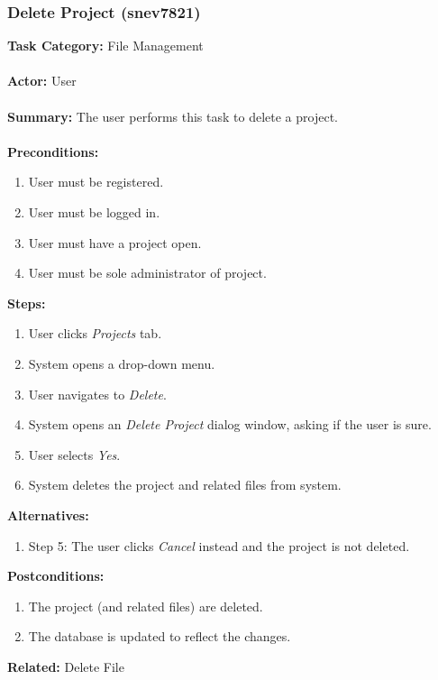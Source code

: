 \documentclass[11pt]{report}
\begin{document}
\subsubsection{Delete Project (snev7821)}
\begin{framed}

	\textbf{Task Category:} File Management \\ \\
	\textbf{Actor:} User \\ \\
	\textbf{Summary:} The user performs this task to delete a project. \\ \\
	\textbf{Preconditions:} 
	\begin{enumerate}
		\item User must be registered.
		\item User must be logged in.
		\item User must have a project open.
		\item User must be sole administrator of project.
	\end{enumerate}
	\textbf{Steps:}
	\begin{enumerate}
		\item User clicks \textit{Projects} tab.
		\item System opens a drop-down menu.
		\item User navigates to \textit{Delete}.
		\item System opens an \textit{Delete Project} dialog window, asking if the user is sure.
		\item User selects \textit{Yes}.
		\item System deletes the project and related files from system.
	\end{enumerate}
	\textbf{Alternatives:} 
	\begin{enumerate}
		\item Step 5: The user clicks \textit{Cancel} instead and the project is not deleted.
	\end{enumerate}
	\textbf{Postconditions:}
	\begin{enumerate}
		\item The project (and related files) are deleted.
		\item The database is updated to reflect the changes.
	\end{enumerate}
		\textbf{Related:} Delete File
\end{framed} 
\newpage
\end{document}
